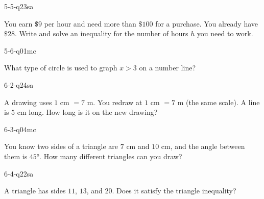 \begin{practiceQuestion}{5-5-q23}{sa}
\begin{questionText}
You earn $\$9$ per hour and need more than $\$100$ for a purchase. You already have $\$28$. Write and solve an inequality for the number of hours $h$ you need to work.
\end{questionText}
\end{practiceQuestion}

\begin{practiceQuestion}{5-6-q01}{mc}
\begin{questionText}
What type of circle is used to graph $x > 3$ on a number line?
\end{questionText}
\end{practiceQuestion}

\begin{practiceQuestion}{6-2-q24}{sa}
\begin{questionText}
A drawing uses $1$ cm $= 7$ m. You redraw at $1$ cm $= 7$ m (the same scale). A line is $5$ cm long. How long is it on the new drawing?
\end{questionText}
\end{practiceQuestion}

\begin{practiceQuestion}{6-3-q04}{mc}
\begin{questionText}
You know two sides of a triangle are $7$ cm and $10$ cm, and the angle between them is $45°$. How many different triangles can you draw?
\end{questionText}
\end{practiceQuestion}

\begin{practiceQuestion}{6-4-q22}{sa}
\begin{questionText}
A triangle has sides $11$, $13$, and $20$. Does it satisfy the triangle inequality?
\end{questionText}
\end{practiceQuestion}

